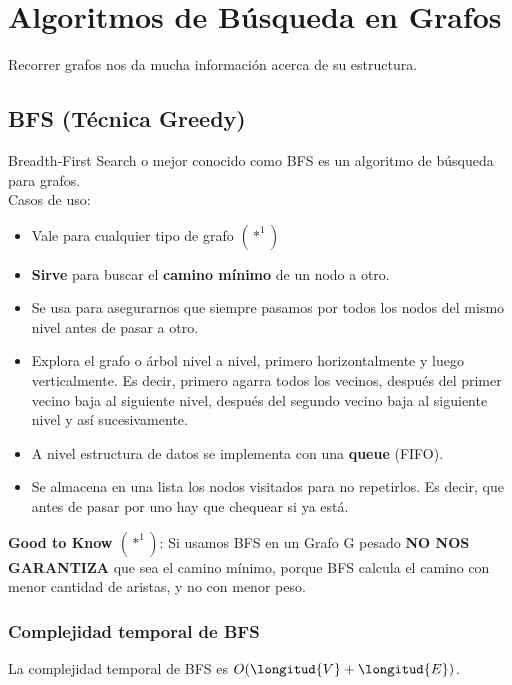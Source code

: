 \documentclass[10pt,a4paper]{article}
\begin{document}
\section*{Algoritmos de Búsqueda en Grafos}
Recorrer grafos nos da mucha información acerca de su estructura.
\subsection*{BFS (Técnica Greedy)}
Breadth-First Search o mejor conocido como BFS es un algoritmo de búsqueda para grafos. \\
Casos de uso: 
\begin{itemize}
    \item Vale para cualquier tipo de grafo $(*^{1})$
    \item \textbf{Sirve} para buscar el \textbf{camino mínimo} de un nodo a otro. 
    \item Se usa para asegurarnos que siempre pasamos por todos los nodos del mismo nivel antes de pasar a otro. 
    \item Explora el grafo o árbol nivel a nivel, primero horizontalmente y luego verticalmente. Es decir, primero agarra todos los vecinos, después del primer vecino baja al siguiente nivel, después del segundo vecino baja al siguiente nivel y así sucesivamente. 
    \item A nivel estructura de datos se implementa con una \textbf{queue} (FIFO).
    \item Se almacena en una lista los nodos visitados para no repetirlos. Es decir, que antes de pasar por uno hay que chequear si ya está.
\end{itemize}
\textbf{Good to Know $(*^{1})$}: Si usamos BFS en un Grafo G pesado \textbf{NO NOS GARANTIZA} que sea el camino mínimo, porque BFS calcula el camino con menor cantidad de aristas, y no con menor peso. 
\subsubsection*{Complejidad temporal de BFS}
La complejidad temporal de BFS es $O(\longitud{V} + \longitud{E})$. 
\end{document}
